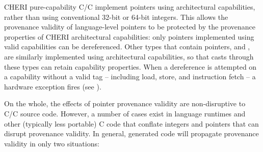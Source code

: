 \documentclass[12pt,twoside,openright,usletter]{article}
\newcommand{\ccode}[1]{{\small\ttfamily{#1}}}
\newcommand{\cuintptrt}{{\ccode{uintptr\_t}}\xspace}
\newcommand{\cintptrt}{{\ccode{intptr\_t}}\xspace}
\newcommand{\note}[2]{{\color{blue}[ Note: #1 - #2]}}
\renewcommand{\note}[2]{\relax\ifhmode\unskip\fi}
\newcommand{\arnote}[1]{\note{#1}{Alex R.}}
\newcommand{\psnote}[1]{\note{#1}{Peter S.}}
\newcommand*{\cpp}[1][]{C\textsmaller[2]{\nolinebreak[4]\hspace{-.05em}\raisebox{.45ex}{\textbf{++}}}}
\newcommand*{\purecapCOrCpp}[1]{CHERI pure-capability C/\cpp{}}
\begin{document}
\purecapCOrCpp{} implement pointers using architectural
capabilities, rather than using conventional 32-bit or 64-bit integers.
This allows the provenance validity of language-level pointers to be
protected by the provenance properties of CHERI architectural capabilities:
only pointers implemented using valid capabilities can be dereferenced.
Other types that contain pointers, \cuintptrt and \cintptrt,
are similarly implemented
using architectural capabilities, so that casts through these types
can retain capability properties.
When a dereference is attempted on a capability without a valid tag --
including load, store, and instruction fetch -- a hardware exception fires
(see ).

On the whole, the effects of pointer provenance validity are non-disruptive to
C/\cpp{} source code.
However, a number of cases exist in language runtimes and other
(typically less portable) C code that conflate integers and pointers that can
disrupt provenance validity.
In general, generated code will propagate provenance validity in only two
situations:
\end{document}
